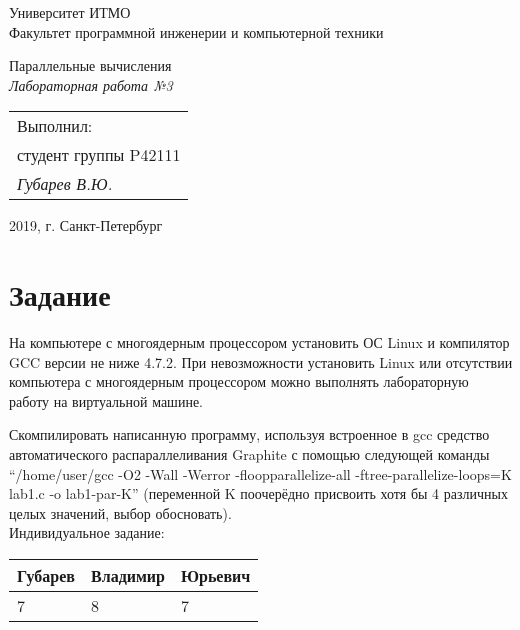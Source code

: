 \documentclass[a4paper,14pt,russian]{extarticle}
\begin{document}
\thispagestyle{empty}
\begin{center}
	{\large
		Университет ИТМО \\
		Факультет программной инженерии и компьютерной техники
	}
\end{center}
\begin{center}
	{\large
		Параллельные вычисления\\
	}
	\it{
		Лабораторная работа №3
	}
\end{center}

\begin{table}[h]
	\begin{flushright}
		\begin{tabular}{l}
			Выполнил:\\ 
			студент группы P42111\\ 
			\it Губарев В.Ю.
		\end{tabular} 
	\end{flushright}	
\end{table}

\begin{center}
	2019, г. Санкт-Петербург
\end{center}
\newpage

\tableofcontents

\newpage


\section{Задание}


На компьютере с многоядерным процессором установить ОС Linux
и компилятор GCC версии не ниже 4.7.2. При невозможности установить Linux или отсутствии компьютера с многоядерным процессором можно выполнять лабораторную работу на виртуальной машине.

Скомпилировать написанную программу, используя встроенное в
gcc средство автоматического распараллеливания Graphite с помощью следующей команды “/home/user/gcc -O2 -Wall -Werror -floopparallelize-all -ftree-parallelize-loops=K lab1.c -o lab1-par-K” (переменной K поочерёдно присвоить хотя бы 4 различных целых значений, выбор обосновать).\\

Индивидуальное задание:
\begin{table}[h]
	\begin{tabular}{|l|l|l|}
		\hline
		Губарев&Владимир&Юрьевич \\\hline
		7&8&7 \\\hline
	\end{tabular}
\end{table}
\end{document}
